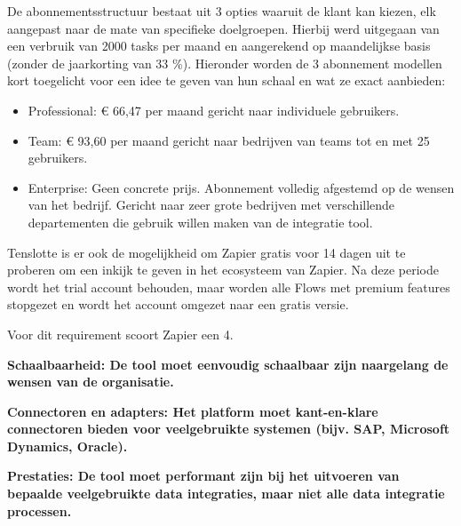 De abonnementsstructuur bestaat uit 3 opties waaruit de klant kan kiezen, elk aangepast naar de mate van specifieke doelgroepen. Hierbij werd uitgegaan van een verbruik van 2000 tasks per maand en aangerekend op maandelijkse basis (zonder de jaarkorting van 33 \%). Hieronder worden de 3 abonnement modellen kort toegelicht voor een idee te geven van hun schaal en wat ze exact aanbieden:

\begin{itemize}
    \item Professional: € 66,47 per maand gericht naar individuele gebruikers.
    \item Team: € 93,60 per maand gericht naar bedrijven van teams tot en met 25 gebruikers.
    \item Enterprise: Geen concrete prijs. Abonnement volledig afgestemd op de wensen van het bedrijf. Gericht naar zeer grote bedrijven met verschillende departementen die gebruik willen maken van de integratie tool.
\end{itemize}

Tenslotte is er ook de mogelijkheid om Zapier gratis voor 14 dagen uit te proberen om een inkijk te geven in het ecosysteem van Zapier. Na deze periode wordt het trial account behouden, maar worden alle Flows met premium features stopgezet en wordt het account omgezet naar een gratis versie.

Voor dit requirement scoort Zapier een 4.

\vspace{\baselineskip}

\textbf{Schaalbaarheid: De tool moet eenvoudig schaalbaar zijn naargelang de wensen van de organisatie.}

\vspace{\baselineskip}



\vspace{\baselineskip}

\textbf{Connectoren en adapters: Het platform moet kant-en-klare connectoren bieden voor veelgebruikte systemen (bijv. SAP, Microsoft Dynamics, Oracle).}
\vspace{\baselineskip}



\vspace{\baselineskip}

\textbf{Prestaties: De tool moet performant zijn bij het uitvoeren van bepaalde veelgebruikte data integraties, maar niet alle data integratie processen.}

